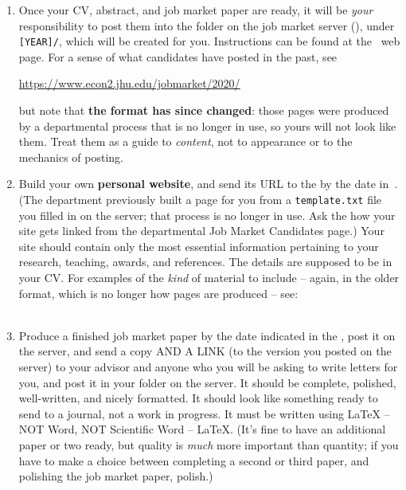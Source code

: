 \documentclass{\classes/econtex}
\begin{document}
\begin{enumerate}
  \hypertarget{Post-To-Server}{}
\item Once your CV, abstract, and job market paper are ready, it will
  be \textit{your} responsibility to post them into the folder
  on the job market server (\JHUPublicJMServerhref), under
  \texttt{[YEAR]/}\Moniker, which will be created for you.
  Instructions can be found at the~{\JMPHLink} web page.  For a sense of what
  candidates have posted in the past, see

  \url{https://www.econ2.jhu.edu/jobmarket/2020/}

  \noindent but note that \textbf{the format has since changed}: those pages were
  produced by a departmental process that is no longer in use, so yours will not
  look like them.  Treat them as a guide to \textit{content}, not to appearance or
  to the mechanics of posting.

  \hypertarget{Template}{}
\item Build your own \textbf{personal website}, and send its URL to the {\JMCC}
  by the date in~\timet.  (The department previously built a page for you from a
  \texttt{template.txt} file you filled in on the server; that process is no
  longer in use.  Ask the {\JMPO} how your site gets linked from the
  departmental Job Market Candidates page.)
  Your site should contain only the most essential information
  pertaining to your research, teaching, awards, and references.
  The details are supposed to be in your CV.
  For examples of the \textit{kind} of material to include -- again, in the older
  format, which is no longer how pages are produced -- see:\\
  \\
  

  \hypertarget{Produce-Job-Paper}{}
\item Produce a finished job market paper by the date indicated in the \timet, post it on the server, and send a copy AND A LINK (to the version you posted on the server) to your advisor and anyone who you will be asking to write letters for you, and post it in your folder on the server.  It should be complete, polished, well-written, and nicely formatted.  It should look like something ready to send to a journal, not a work in progress.  It must be written using {\LaTeX} -- NOT Word, NOT Scientific Word -- {\LaTeX}.  (It's fine to have an additional paper or two ready, but quality is \textit{much} more important than quantity; if you have to make a choice between completing a second or third paper, and polishing the job market paper, polish.)
  

\end{enumerate}
\end{document}
